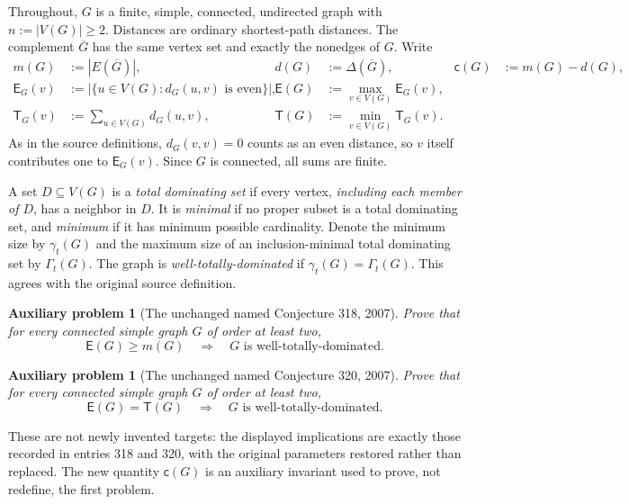 \documentclass[11pt,a4paper]{article}
\newtheorem{problem}[theorem]{Auxiliary problem}
\theoremstyle{definition}\newtheorem{definition}[theorem]{Definition}
\theoremstyle{remark}\newtheorem{remark}[theorem]{Remark}
\newcommand{\Gbar}{\overline G}
\newcommand{\epar}{\mathsf E}
\newcommand{\trans}{\mathsf T}
\newcommand{\compdef}{\mathsf c}
\newcommand{\V}{V(G)}
\begin{document}
Throughout, $G$ is a finite, simple, connected, undirected graph with $n:=|\V|\ge2$. Distances are ordinary shortest-path distances. The complement $\Gbar$ has the same vertex set and exactly the nonedges of $G$. Write
\begin{align}
 m(G)&:=|E(\Gbar)|, & d(G)&:=\Delta(\Gbar), & \compdef(G)&:=m(G)-d(G),\label{eq:defect}\\
 \epar_G(v)&:=|\{u\in\V:d_G(u,v)\text{ is even}\}|, &
 \epar(G)&:=\max_{v\in\V}\epar_G(v),\label{eq:even}\\
 \trans_G(v)&:=\sum_{u\in\V}d_G(u,v), &
 \trans(G)&:=\min_{v\in\V}\trans_G(v).\label{eq:transmission}
\end{align}
As in the source definitions, $d_G(v,v)=0$ counts as an even distance, so $v$ itself contributes one to $\epar_G(v)$. Since $G$ is connected, all sums are finite.

A set $D\subseteq\V$ is a \emph{total dominating set} if every vertex, \emph{including each member of $D$}, has a neighbor in $D$. It is \emph{minimal} if no proper subset is a total dominating set, and \emph{minimum} if it has minimum possible cardinality. Denote the minimum size by $\gamma_t(G)$ and the maximum size of an inclusion-minimal total dominating set by $\Gamma_t(G)$. The graph is \emph{well-totally-dominated} if $\gamma_t(G)=\Gamma_t(G)$. This agrees with the original source definition.

\begin{problem}[The unchanged named Conjecture 318, 2007]\label{prob:318}
Prove that for every connected simple graph $G$ of order at least two,
\begin{equation}\label{eq:318}
\epar(G)\ge m(G)\quad\Longrightarrow\quad G\text{ is well-totally-dominated}.
\end{equation}
\end{problem}
\begin{problem}[The unchanged named Conjecture 320, 2007]\label{prob:320}
Prove that for every connected simple graph $G$ of order at least two,
\begin{equation}\label{eq:320}
\epar(G)=\trans(G)\quad\Longrightarrow\quad G\text{ is well-totally-dominated}.
\end{equation}
\end{problem}
These are not newly invented targets: the displayed implications are exactly those recorded in entries 318 and 320, with the original parameters restored rather than replaced. The new quantity $\compdef(G)$ is an auxiliary invariant used to prove, not redefine, the first problem.
\end{document}
